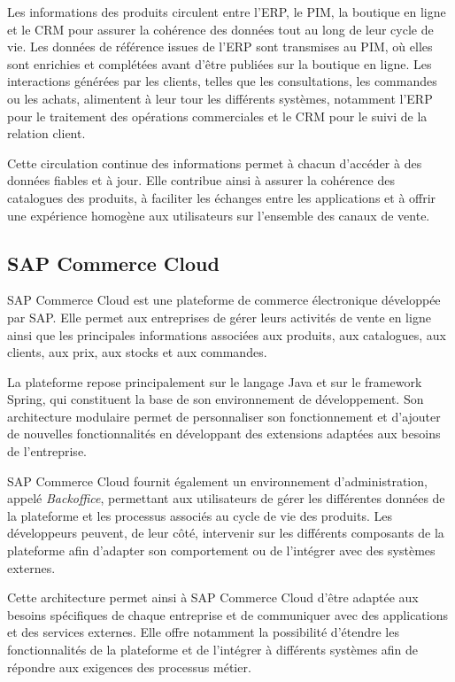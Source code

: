 Les informations des produits circulent entre l'ERP, le PIM, la boutique en ligne et le CRM pour assurer la cohérence des données tout au long de leur cycle de vie. Les données de référence issues de l'ERP sont transmises au PIM, où elles sont enrichies et complétées avant d'être publiées sur la boutique en ligne. Les interactions générées par les clients, telles que les consultations, les commandes ou les achats, alimentent à leur tour les différents systèmes, notamment l'ERP pour le traitement des opérations commerciales et le CRM pour le suivi de la relation client.

Cette circulation continue des informations permet à chacun d'accéder à des données fiables et à jour. Elle contribue ainsi à assurer la cohérence des catalogues des produits, à faciliter les échanges entre les applications et à offrir une expérience homogène aux utilisateurs sur l'ensemble des canaux de vente.

\newpage

\subsection{SAP Commerce Cloud}

SAP Commerce Cloud  est une plateforme de commerce électronique développée par SAP. Elle permet aux entreprises de gérer leurs activités de vente en ligne ainsi que les principales informations associées aux produits, aux catalogues, aux clients, aux prix, aux stocks et aux commandes.

La plateforme repose principalement sur le langage Java et sur le framework Spring, qui constituent la base de son environnement de développement. Son architecture modulaire permet de personnaliser son fonctionnement et d'ajouter de nouvelles fonctionnalités en développant des extensions adaptées aux besoins de l'entreprise.

SAP Commerce Cloud fournit également un environnement d'administration, appelé \textit{Backoffice}, permettant aux utilisateurs de gérer les différentes données de la plateforme et les processus associés au cycle de vie des produits. Les développeurs peuvent, de leur côté, intervenir sur les différents composants de la plateforme afin d'adapter son comportement ou de l'intégrer avec des systèmes externes.

Cette architecture permet ainsi à SAP Commerce Cloud d'être adaptée aux besoins spécifiques de chaque entreprise et de communiquer avec des applications et des services externes. Elle offre notamment la possibilité d'étendre les fonctionnalités de la plateforme et de l'intégrer à différents systèmes afin de répondre aux exigences des processus métier.
